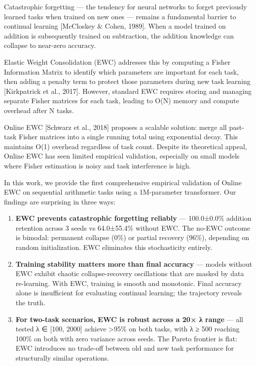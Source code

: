 \documentclass[
]{article}
\providecommand{\tightlist}{%
  \setlength{\itemsep}{0pt}\setlength{\parskip}{0pt}}
\begin{document}
Catastrophic forgetting --- the tendency for neural networks to forget
previously learned tasks when trained on new ones --- remains a
fundamental barrier to continual learning {[}McCloskey \& Cohen,
1989{]}. When a model trained on addition is subsequently trained on
subtraction, the addition knowledge can collapse to near-zero accuracy.

Elastic Weight Consolidation (EWC) addresses this by computing a Fisher
Information Matrix to identify which parameters are important for each
task, then adding a penalty term to protect those parameters during new
task learning {[}Kirkpatrick et al., 2017{]}. However, standard EWC
requires storing and managing separate Fisher matrices for each task,
leading to O(N) memory and compute overhead after N tasks.

Online EWC {[}Schwarz et al., 2018{]} proposes a scalable solution:
merge all past-task Fisher matrices into a single running total using
exponential decay. This maintains O(1) overhead regardless of task
count. Despite its theoretical appeal, Online EWC has seen limited
empirical validation, especially on small models where Fisher estimation
is noisy and task interference is high.

In this work, we provide the first comprehensive empirical validation of
Online EWC on sequential arithmetic tasks using a 1M-parameter
transformer. Our findings are surprising in three ways:

\begin{enumerate}
\def\labelenumi{\arabic{enumi}.}
\tightlist
\item
  \textbf{EWC prevents catastrophic forgetting reliably} --- 100.0±0.0\%
  addition retention across 3 seeds vs 64.0±55.4\% without EWC. The
  no-EWC outcome is bimodal: permanent collapse (0\%) or partial
  recovery (96\%), depending on random initialization. EWC eliminates
  this stochasticity entirely.
\item
  \textbf{Training stability matters more than final accuracy} ---
  models without EWC exhibit chaotic collapse-recovery oscillations that
  are masked by data re-learning. With EWC, training is smooth and
  monotonic. Final accuracy alone is insufficient for evaluating
  continual learning; the trajectory reveals the truth.
\item
  \textbf{For two-task scenarios, EWC is robust across a 20× λ range}
  --- all tested λ ∈ {[}100, 2000{]} achieve \textgreater95\% on both
  tasks, with λ ≥ 500 reaching 100\% on both with zero variance across
  seeds. The Pareto frontier is flat: EWC introduces no trade-off
  between old and new task performance for structurally similar
  operations.
\end{enumerate}
\end{document}
